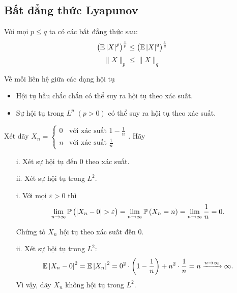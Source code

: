 \subsection{Bất đẳng thức Lyapunov}
Với mọi $p \leq q$ ta có các bất đẳng thức sau:
$$\left( \mathbb{E}\left| X \right|^p \right)^{\frac{1}{p}} \leq \left( \mathbb{E}\left|X\right|^q \right)^{\frac{1}{q}} $$
$$\|X\|_p \leq \|X\|_q$$
\begin{remark*}
Về mối liên hệ giữa các dạng hội tụ
\begin{itemize}
    \item Hội tụ hầu chắc chắn có thể suy ra hội tụ theo xác suất.
    \item Sự hội tụ trong $L^p$ $\left( p>0 \right)$ có thể suy ra hội tụ theo xác suất.
\end{itemize}
\end{remark*}
\begin{exam*}
Xét dãy $X_n = \begin{cases}
   0 & \text{với xác suất } 1 - \frac{1}{n}\\
   n & \text{với xác suất } \frac{1}{n} \end{cases}$. Hãy
\begin{itemize}
    \item[i.] Xét sự hội tụ đến 0 theo xác suất.
    \item[ii.] Xét sự hội tụ trong $L^2$.
\end{itemize}
\end{exam*}
\begin{sol*}
    \begin{itemize}
    \item[i.] Với mọi $\varepsilon >0$ thì 
    \begin{align*}
        \lim\limits_{n \to \infty}\mathbb{P} \left( \left| X_n - 0 \right| > \varepsilon \right) = \lim\limits_{n \to \infty}\mathbb{P} \left(X_n = n \right) = \lim\limits_{n \to \infty} \frac{1}{n} = 0.
    \end{align*}
    
    Chứng tỏ ${X_n}$ hội tụ theo xác suất đến 0.
    \item[ii.] Xét sự hội tụ trong $L^2$:
    \[\mathbb{E} \left| X_n - 0 \right|^2 = \mathbb{E} \left| X_n \right|^2 = 0^2 \cdot \left(1 - \frac{1}{n}\right) + n^2 \cdot \frac{1}{n} = n\xrightarrow[]{n\to \infty} \infty.\]
    Vì vậy, dãy ${X_n}$ không hội tụ trong $L^2$.
\end{itemize}      
\end{sol*}
